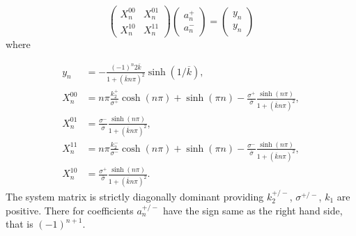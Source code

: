 \documentclass[a4paper,10pt]{article}
\def\ol#1{\overline{#1}}
\begin{document}
\begin{equation}
    \label{eq:an_system}
    \begin{pmatrix} 
            X_n^{00} & X_n^{01} \\ 
            X_n^{10} & X_n^{11}
    \end{pmatrix}
    \begin{pmatrix} 
        a_n^+  \\ 
        a_n^-     
    \end{pmatrix}
     =  
    \begin{pmatrix} 
        y_n \\ 
        y_n
    \end{pmatrix}
\end{equation}
where
% 

\begin{align}
    y_n     &= -\frac{(-1)^n 2 \ol{k}}{1+(\ol{k} n \pi)^2}\sinh(1/\ol{k}), \\
    X_n^{00}  &= n \pi \frac{k_2^+ }{\sigma^+}  \cosh(n \pi) 
              + \sinh(\pi n)  - \frac{\sigma^+ }{\ol{\sigma}}\frac{\sinh(n \pi)}{1 + (\ol{k} n \pi)^2}, \\
    X_n^{01}  &= \frac{\sigma^- }{\ol{\sigma}}\frac{\sinh(n \pi)}{1 + (\ol{k} n \pi)^2}, \\
    X_n^{11}  &= n \pi \frac{k_2^- }{\sigma^-}  \cosh(n \pi) 
              + \sinh(\pi n)  - \frac{\sigma^- }{\ol{\sigma}}\frac{\sinh(n \pi)}{1 + (\ol{k} n \pi)^2}, \\
    X_n^{10}  &= \frac{\sigma^+ }{\ol{\sigma}}\frac{\sinh(n \pi)}{1 + (\ol{k} n \pi)^2}. 
\end{align}
The system matrix is strictly diagonally dominant providing $k_2^{+/-}$, $\sigma^{+/-}$, $k_1$ are positive.
There for coefficients $a_n^{+/-}$ have the sign same as the right hand side, that is $(-1)^{n+1}$.
\end{document}
